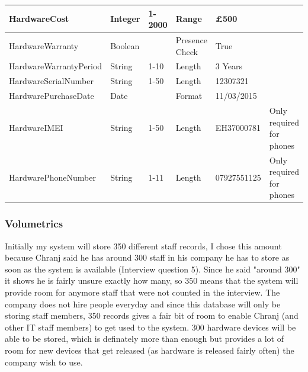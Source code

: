 \begin{center}
\begin{tabular}{|p{4cm}|p{1.3cm}|p{1.1cm}|p{1.7cm}|p{1.7cm}|p{2cm}|}
HardwareCost                       & Integer                                 & 1-2000                               & Range                                    & £500                  &                       \\ \hline
HardwareWarranty                    & Boolean                                 &                                      & Presence Check                           & True                  &                       \\ \hline
HardwareWarrantyPeriod              & String                                  & 1-10                                 & Length                                   & 3 Years               &                       \\ \hline
HardwareSerialNumber                & String                                  & 1-50                                 & Length                                   & 12307321              &                       \\ \hline
HardwarePurchaseDate                & Date                                  &                                  & Format                                   & 11/03/2015              &                       \\ \hline
HardwareIMEI                & String                                  &          1-50                        & Length                                   & EH37000781               & Only required for phones                      \\ \hline
HardwarePhoneNumber                & String                                  &1-11                                  & Length                                   & 07927551125              &   Only required for phones                      \\ \hline
\end{tabular}
\end{center}

\subsubsection{Volumetrics}

Initially my system will store 350 different staff records, I chose this amount because Chranj said he has around 300 staff in his company he has to store as soon as the system is available (Interview question 5). Since he said "around 300" it shows he is fairly unsure exactly how many, so 350 means that the system will provide room for anymore staff that were not counted in the interview. The company does not hire people everyday and since this database will only be storing staff members, 350 records gives a fair bit of room to enable Chranj (and other IT staff members) to get used to the system. 300 hardware devices will be able to be stored, which is definately more than enough but provides a lot of room for new devices that get released (as hardware is released fairly often) the company wish to use.

